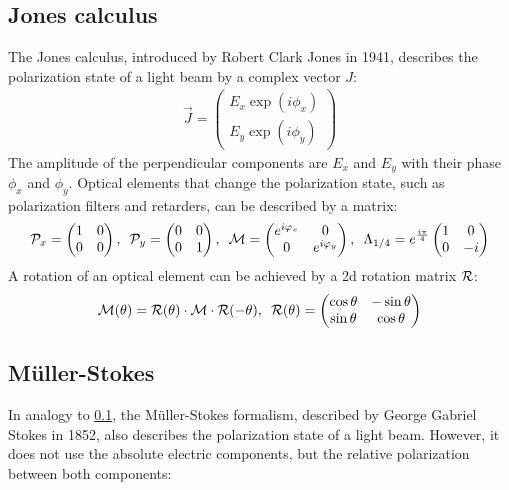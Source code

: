 \subsection{Jones calculus}
\label{sec:jones}
%
The Jones calculus, introduced by Robert Clark Jones in 1941, describes the polarization state of a light beam by a complex vector $J$:
%
\begin{align}
    \vec{J} = \begin{pmatrix} E_x \exp(i \phi_x) \\ E_y \exp(i \phi_y) \end{pmatrix}
\end{align}
%
The amplitude of the perpendicular components are $E_x$ and $E_y$ with their phase $\phi_x$ and $\phi_y$.
Optical elements that change the polarization state, such as polarization filters and retarders, can be described by a matrix:
%
\begin{align}
\begin{split}
\mathcal{P}_x =
\begin{pmatrix}
1 & 0 \\ 0 & 0
\end{pmatrix}
, \enspace
\mathcal{P}_y =
\begin{pmatrix}
0 & 0 \\ 0 & 1
\end{pmatrix}
, \enspace
\mathcal{M} =
\begin{pmatrix}
e^{i \varphi_x} & 0 \\ 0 & e^{i \varphi_y}
\end{pmatrix}
, \enspace
\Lambda_{1/4}=
e^{\frac{i \pi}{4}}
\begin{pmatrix}
1 & 0 \\ 0 & -i
\end{pmatrix}
\end{split}
\end{align}
%
A rotation of an optical element can be achieved by a 2d rotation matrix $\mathcal{R}$:
%
\begin{align}
\begin{split}
\mathcal{M}(\theta )=\mathcal{R}(\theta )\cdot\mathcal{M}\cdot\mathcal{R}(-\theta )
, \enspace
\mathcal{R}(\theta ) =
\begin{pmatrix}
\cos \theta & -\sin \theta \\
\sin \theta & \cos \theta
\end{pmatrix}
\end{split}
\label{eq::JonesRotation}
\end{align}
%
%
%
\subsection{M{\"u}ller-Stokes}\label{sec:Mueller-Stokes}
\label{sec:mueller_stokes}
%
In analogy to \cref{sec:jones}, the M{\"u}ller-Stokes formalism, described by George Gabriel Stokes in 1852, also describes the polarization state of a light beam.
However, it does not use the absolute electric components, but the relative polarization between both components:
%

